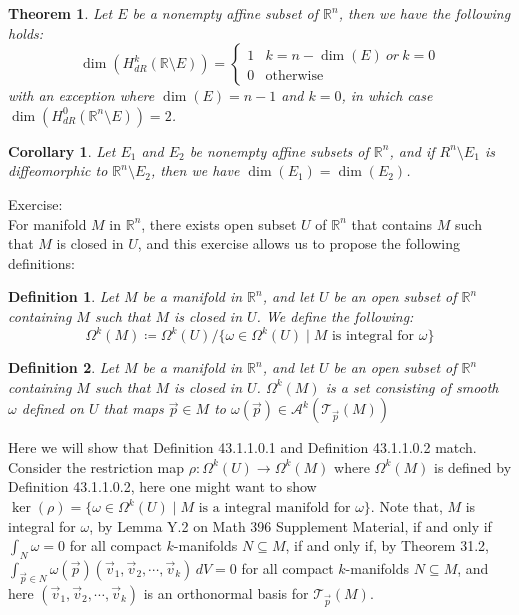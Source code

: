 \documentclass[11pt,oneside]{book}
\theoremstyle{break}
\theoremstyle{break}
\newtheorem{thm}{Theorem}[section]
\newtheorem{corT}[lem]{Corollary}
\newtheorem{defn}{Definition}[corL]
\newcommand{\R}{\mathbb{R}}
\newcommand{\T}{\mathcal{T}}
\newcommand{\A}{\mathcal{A}}
\newcommand{\exercise}{\color{green}Exercise: \color{black}}
\begin{document}
\begin{thm}
Let $E$ be a nonempty affine subset of $\R^n$, then we have the following holds:
$$\dim(H^k_{dR}(\R \setminus E)) = \begin{cases} 1 & k=n-\dim(E) \ or\ k=0 \\ 0 &\text{otherwise}\end{cases}$$
with an exception where $\dim(E) = n-1$ and $k=0$, in which case $\dim(H_{dR}^0 (\R^n \setminus E)) = 2$.
\end{thm}

\begin{corT}
Let $E_1$ and $E_2$ be nonempty affine subsets of $\R^n$, and if $R^n \setminus E_1$ is diffeomorphic to $\R^n \setminus E_2$, then we have $\dim(E_1) = \dim(E_2)$. 
\end{corT}

\exercise \\
For manifold $M$ in $\R^n$, there exists open subset $U$ of $\R^n$ that contains $M$ such that $M$ is closed in $U$, and this exercise allows us to propose the following definitions:

\begin{defn}
Let $M$ be a manifold in $\R^n$, and let $U$ be an open subset of $\R^n$ containing $M$ such that $M$ is closed in $U$. We define the following:
$$\Omega^k(M) \coloneqq \Omega^k(U) /\{ \omega \in \Omega^k(U) \mid M \text{ is integral for }\omega\}$$
\end{defn}

\begin{defn}
Let $M$ be a manifold in $\R^n$, and let $U$ be an open subset of $\R^n$ containing $M$ such that $M$ is closed in $U$. $\Omega^k(M)$ is a set consisting of smooth $\omega$ defined on $U$ that maps $\vec{p}\in M$ to $\omega(\vec{p}) \in \A^k(\T_{\vec{p}}(M))$
\end{defn}

Here we will show that Definition 43.1.1.0.1 and Definition 43.1.1.0.2 match. Consider the restriction map $\rho:\Omega^k(U)\to \Omega^k(M)$ where $ \Omega^k(M)$ is defined by Definition 43.1.1.0.2, here one might want to show $\ker(\rho) = \{ \omega \in \Omega^k(U) \mid M \text{ is a integral manifold for }\omega\}$. Note that, $M$ is integral for $\omega$, by Lemma Y.2 on Math 396 Supplement Material, if and only if $\int_N \omega  = 0$ for all compact $k$-manifolds $N\subseteq M$, if and only if, by Theorem 31.2, $\int_{\vec{p}\in N}\omega (\vec{p}) ( \vec{v}_1,\vec{v}_2,\cdots,  \vec{v}_k)\,dV = 0$ for all compact $k$-manifolds $N\subseteq M$, and here $(\vec{v}_1,\vec{v}_2,\cdots, \vec{v}_k)$ is an orthonormal basis for $\T_{\vec{p}}(M)$.\\
\end{document}
